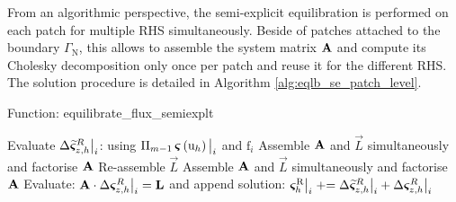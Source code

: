 From an algorithmic perspective, the semi-explicit equilibration is performed on each patch for multiple RHS simultaneously.
Beside of patches attached to the boundary $\Gamma_\mathrm{N}$, this allows to assemble the system matrix $\bm{\mathrm{A}}$ and compute its Cholesky decomposition only once per patch and reuse it for the different RHS. 
The solution procedure is detailed in Algorithm \ref{alg:eqlb_se_patch_level}.
\begin{algorithm}
    \caption{Function: equilibrate\_flux\_semiexplt}
    \label{alg:eqlb_se_patch_level}



    {
        Evaluate $\Delta\widetilde{\bm{\varsigma}}^R_{z,h}\big\vert_i$: \cite[Algorithm 2]{Bertrand_HHO_2023} using $\Pi_{m-1}\,\bm{\varsigma}\left(\mathrm{u}_h\right)\big\vert_i$ and $\mathrm{f}_i$\;
        \BlankLine
        {
            Assemble $\bm{\mathrm{A}}$ and $\vec{L}$ simultaneously and factorise $\bm{\mathrm{A}}$\;
        }
        \Else
        {
            {
                Re-assemble $\vec{L}$
            }
            \lElse
            {
                Assemble $\bm{\mathrm{A}}$ and $\vec{L}$ simultaneously and factorise $\bm{\mathrm{A}}$
            } 
        }
        \BlankLine
        Evaluate: $\bm{\mathrm{A}}\cdot\Delta\bm{\varsigma}^R_{z,h}\big\vert_i = \bm{\mathrm{L}}$ and append solution: $\bm{\varsigma}^{\mathrm{R}}_h\big\vert_i \mathrel{+}= \Delta\widetilde{\bm{\varsigma}}^R_{z,h}\big\vert_i + \Delta\bm{\varsigma}^R_{z,h}\big\vert_i$\;
    }
\end{algorithm} 

